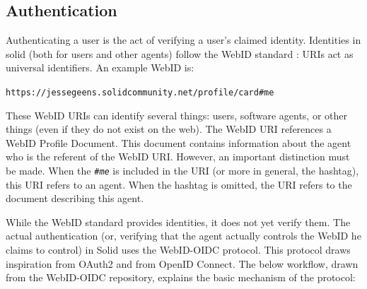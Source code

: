 \subsection{Authentication}
Authenticating a user is the act of verifying a user's claimed identity. Identities in solid (both for users and other agents) follow the WebID standard \citep{webid}: URIs act as universal identifiers. An example WebID is:

\begin{center}
   \texttt{https://jessegeens.solidcommunity.net/profile/card\#me}\\
\end{center}

\noindent These WebID URIs can identify several things: users, software agents, or other things (even if they do not exist on the web). The WebID URI references a WebID Profile Document. This document contains information about the agent who is the referent of the WebID URI. However, an important distinction must be made. When the \textit{\texttt{\#me}} is included in the URI (or more in general, the hashtag), this URI refers to an agent. When the hashtag is omitted, the URI refers to the document describing this agent.

While the WebID standard provides identities, it does not yet verify them. The actual authentication (or, verifying that the agent actually controls the WebID he claims to control) in Solid uses the WebID-OIDC protocol. This protocol draws inspiration from OAuth2 and from OpenID Connect. The below workflow, drawn from the WebID-OIDC repository, explains the basic mechanism of the protocol:

